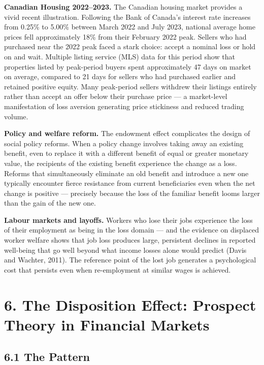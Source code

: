 \documentclass[12pt, letterpaper]{article}
\begin{document}
\textbf{Canadian Housing 2022--2023.} The Canadian housing market provides a vivid recent illustration. Following the Bank of Canada's interest rate increases from 0.25\% to 5.00\% between March 2022 and July 2023, national average home prices fell approximately 18\% from their February 2022 peak. Sellers who had purchased near the 2022 peak faced a stark choice: accept a nominal loss or hold on and wait. Multiple listing service (MLS) data for this period show that properties listed by peak-period buyers spent approximately 47 days on market on average, compared to 21 days for sellers who had purchased earlier and retained positive equity. Many peak-period sellers withdrew their listings entirely rather than accept an offer below their purchase price --- a market-level manifestation of loss aversion generating price stickiness and reduced trading volume.

\textbf{Policy and welfare reform.} The endowment effect complicates the design of social policy reforms. When a policy change involves taking away an existing benefit, even to replace it with a different benefit of equal or greater monetary value, the recipients of the existing benefit experience the change as a loss. Reforms that simultaneously eliminate an old benefit and introduce a new one typically encounter fierce resistance from current beneficiaries even when the net change is positive --- precisely because the loss of the familiar benefit looms larger than the gain of the new one.

\textbf{Labour markets and layoffs.} Workers who lose their jobs experience the loss of their employment as being in the loss domain --- and the evidence on displaced worker welfare shows that job loss produces large, persistent declines in reported well-being that go well beyond what income losses alone would predict (Davis and Wachter, 2011). The reference point of the lost job generates a psychological cost that persists even when re-employment at similar wages is achieved.

\medskip


\section{6. The Disposition Effect: Prospect Theory in Financial Markets}



\subsection{6.1 The Pattern}
\end{document}
